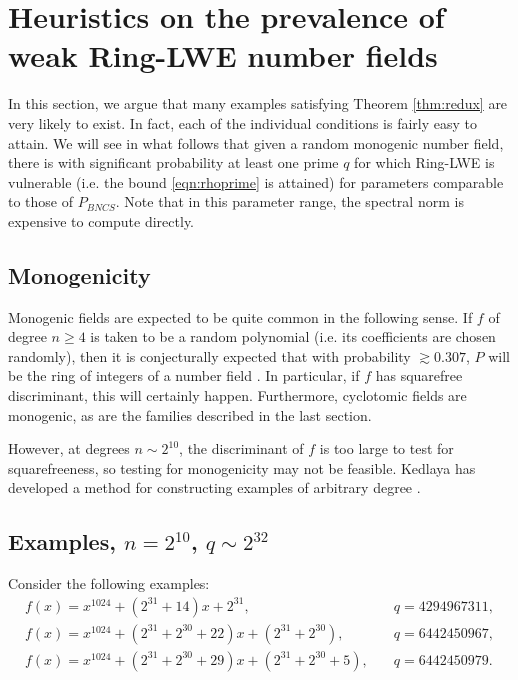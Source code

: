 \documentclass{llncs}
\newcommand{\<}{\langle}
\renewcommand{\>}{\rangle}
\begin{document}
\section{Heuristics on the prevalence of weak Ring-LWE number fields}
\label{sec:heuristic}

In this section, we argue that many examples satisfying Theorem \ref{thm:redux} are very likely to exist.  In fact, each of the individual conditions is fairly easy to attain.  We will see in what follows that given a random monogenic number field, there is with significant probability at least one prime $q$ for which Ring-LWE is vulnerable (i.e. the bound \eqref{eqn:rhoprime} is attained) for parameters comparable to those of $P_{BNCS}$.  Note that in this parameter range, the spectral norm is expensive to compute directly.


\subsection{Monogenicity}

        Monogenic fields are expected to be quite common in the following sense.  If $f$ of degree $n \ge 4$ is taken to be a random polynomial (i.e. its coefficients are chosen randomly), then it is conjecturally expected that with probability $\gtrsim 0.307$, $P$ will be the ring of integers of a number field \cite{K}.  In particular, if $f$ has squarefree discriminant, this will certainly happen.  Furthermore, cyclotomic fields are monogenic, as are the families described in the last section.

        However, at degrees $n \sim 2^{10}$, the discriminant of $f$ is too large to test for squarefreeness, so testing for monogenicity may not be feasible.  Kedlaya has developed a method for constructing examples of arbitrary degree \cite{K}.

\subsection{Examples, $n = 2^{10}$, $q \sim 2^{32}$}
\label{sec:8examples}

Consider the following examples:
\begin{align*}
        f(x) = x^{1024} + (2^{31}+14)x + 2^{31}, &\quad q = 4294967311, \\
      f(x) = x^{1024} + (2^{31}+2^{30}+22)x + (2^{31}+2^{30}), &\quad q = 6442450967,  \\
     f(x) = x^{1024} + (2^{31}+2^{30}+29)x + (2^{31}+2^{30}+5), &\quad q = 6442450979.
\end{align*}
\end{document}
